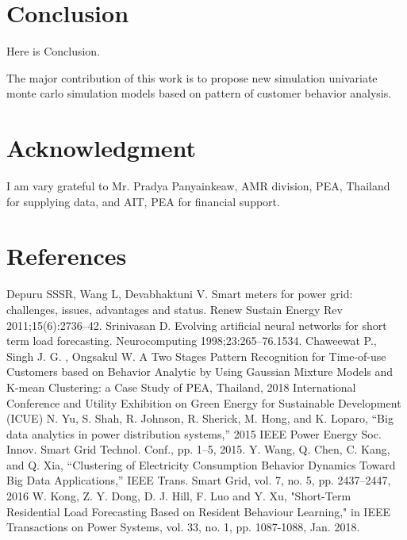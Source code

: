 \documentclass[conference]{IEEEtran}
\begin{document}
\section{Conclusion}
Here is Conclusion.

The major contribution of this work is to propose new simulation univariate monte carlo simulation models based on pattern of customer behavior analysis.


\section*{Acknowledgment}
I am vary grateful to Mr. Pradya Panyainkeaw, AMR division, PEA, Thailand for supplying data, and AIT, PEA for financial support.


\section*{References}

\begin{thebibliography}{00}
 Depuru SSSR, Wang L, Devabhaktuni V. Smart meters for power grid: challenges, issues, advantages and status. Renew Sustain Energy Rev 2011;15(6):2736–42.
 Srinivasan D. Evolving artificial neural networks for short term load forecasting. Neurocomputing 1998;23:265–76.1534.
 Chaweewat P., Singh J. G. , Ongsakul W. A Two Stages Pattern Recognition for Time-of-use Customers based on Behavior Analytic by Using Gaussian Mixture Models and K-mean Clustering: a Case Study of PEA, Thailand, 2018 International Conference and Utility Exhibition on Green Energy for Sustainable Development (ICUE)
 N. Yu, S. Shah, R. Johnson, R. Sherick, M. Hong, and K. Loparo, “Big data analytics in power distribution systems,” 2015 IEEE Power Energy Soc. Innov. Smart Grid Technol. Conf., pp. 1–5, 2015.
 Y. Wang, Q. Chen, C. Kang, and Q. Xia, “Clustering of Electricity Consumption Behavior Dynamics Toward Big Data Applications,” IEEE Trans. Smart Grid, vol. 7, no. 5, pp. 2437–2447, 2016
 W. Kong, Z. Y. Dong, D. J. Hill, F. Luo and Y. Xu, "Short-Term Residential Load Forecasting Based on Resident Behaviour Learning," in IEEE Transactions on Power Systems, vol. 33, no. 1, pp. 1087-1088, Jan. 2018.
\end{thebibliography}
\end{document}
